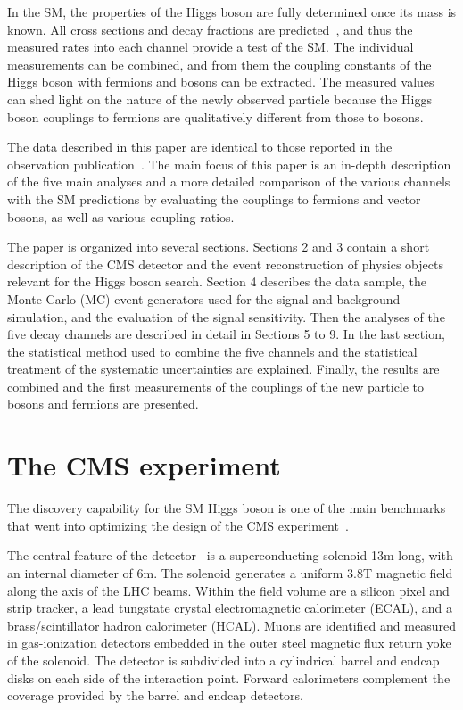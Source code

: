 \documentclass[12pt,twoside,a4paper,cmspaper,final,collab]{cms-tdr}
\begin{document}
In the SM, the properties of the Higgs boson are fully determined once its mass is
known.  All cross sections and decay fractions are
predicted~\cite{LHCHiggsCrossSectionWorkingGroup:2011ti,Dittmaier:2012vm},
and thus the measured rates into each channel provide a test of the SM.
The individual measurements can be combined, and from them the coupling constants
of the Higgs boson with fermions and bosons can be extracted.
The measured values can shed light on  the nature of the newly
observed particle because the Higgs boson
couplings to fermions are qualitatively different from those to bosons.

The data described in this paper are
identical to those reported in
the observation publication~\cite{CMSobservation125}. The main focus of this paper
is an in-depth description of the five main analyses and a more detailed
comparison of the various channels with the SM predictions by
evaluating the couplings to fermions and vector bosons, as well as various coupling ratios.

The paper is organized into several sections. Sections 2 and 3 contain a short description of the CMS detector
and the event reconstruction of physics objects relevant for the Higgs boson search.
Section 4 describes the data sample, the Monte Carlo (MC) event generators used for the signal
and background simulation, and the evaluation of the signal sensitivity.
Then the analyses of the five decay channels
are described in detail in Sections 5 to 9.
In the last section, the statistical method used to combine the five channels and the statistical treatment of the systematic uncertainties
are explained. Finally, the results are combined and the first measurements of the couplings of the new particle to bosons and fermions
are presented.




\section{The CMS experiment}\label{sec:experiment}
The discovery capability for the SM Higgs boson is one of the
main benchmarks that went into optimizing the design of the
CMS experiment~\cite{Pimia:1990zy,DellaNegra:1992hp,Ellis:1994sq,Chatrchyan:2008aa}.

The central feature of the detector~\cite{Chatrchyan:2008aa} is a superconducting solenoid 13\unit{m} long,
with an internal diameter of 6\unit{m}.  The solenoid generates a uniform 3.8\unit{T} magnetic
field along the axis of the LHC beams.  Within the field volume are a silicon
pixel and strip tracker, a lead tungstate crystal electromagnetic calorimeter (ECAL),
and a brass/scintillator hadron calorimeter (HCAL).  Muons are identified and measured in gas-ionization
detectors embedded in the outer steel magnetic flux return yoke of the solenoid.
The detector is subdivided into a cylindrical barrel and endcap disks on each side of
the interaction point.  Forward calorimeters
complement the coverage provided by the barrel and endcap detectors.
\end{document}
